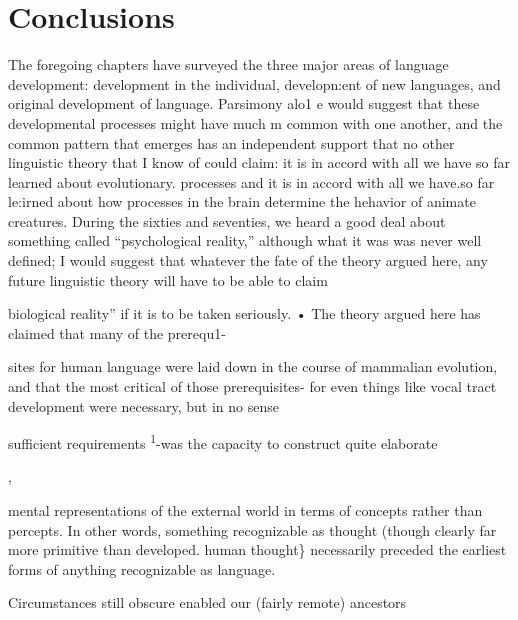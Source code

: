 \chapter{Conclusions}\label{ch:5}

The foregoing chapters have surveyed the three major areas of language development: development in the individual, developn:ent of new languages, and original development of language. Parsimony alo1 e would suggest that these developmental processes might have much m common with one another, and the common pattern that emerges has an independent support that no other linguistic theory that I know of could claim: it is in accord with all we have so far learned about evo\-lutionary. processes and it is in accord with all we have.so far le:irned about how processes in the brain determine the hehavior of animate creatures. During the sixties and seventies, we heard a good deal about something called ``psychological reality,'' although what it was was never well defined; I would suggest that whatever the fate of the theory argued here, any future linguistic theory will have to be able to claim

{\textquotedbl}biological reality'' if it is to be taken seriously. • The theory argued here has claimed that many of the prerequ1{}-

sites for human language were laid down in the course of mammalian evolution, and that the most critical of those prerequisites- for even things like vocal tract development were necessary, but in no sense

sufficient requirements \textsuperscript{1}{}-was the capacity to construct quite elaborate 

,

mental representations of the external world in terms of concepts rather than percepts. In other words, something recognizable as thought (though clearly far more primitive than developed. human thought\} necessarily preceded the earliest forms of anything recognizable as language.

Circumstances still obscure enabled our (fairly remote) ancestors

